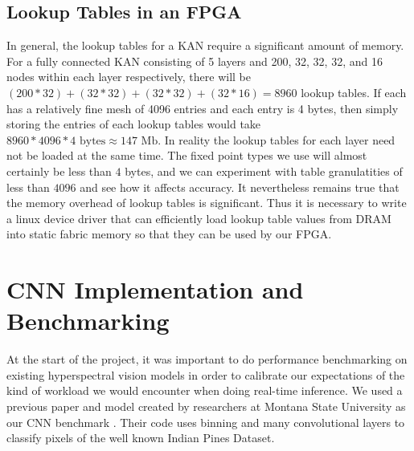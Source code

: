 \documentclass[psamsfonts]{amsart}
\theoremstyle{definition}
\theoremstyle{remark}
\numberwithin{equation}{section}
\begin{document}
\subsection{Lookup Tables in an FPGA}
In general, the lookup tables for a KAN require a significant amount of memory. For a fully connected KAN consisting of 5 layers and 200, 32, 32, 32, and 16 nodes within each layer respectively, there will be $(200 * 32) + (32 * 32) + (32 * 32) + (32 * 16) = 8960$ lookup tables. If each has a relatively fine mesh of 4096 entries and each entry is 4 bytes, then simply storing the entries of each lookup tables would take $8960 * 4096 * 4 \text{ bytes} \approx 147 \text{ Mb}$. In reality the lookup tables for each layer need not be loaded at the same time. The fixed point types we use will almost certainly be less than $4$ bytes, and we can experiment with table granulatities of less than $4096$ and see how it affects accuracy. It nevertheless remains true that the memory overhead of lookup tables is significant. Thus it is necessary to write a linux device driver that can efficiently load lookup table values from DRAM into static fabric memory so that they can be used by our FPGA.



\section{CNN Implementation and Benchmarking}
At the start of the project, it was important to do performance benchmarking on existing hyperspectral vision models in order to calibrate our expectations of the kind of workload we would encounter when doing real-time inference. We used a previous paper and model created by researchers at Montana State University as our CNN benchmark \cite{Morales_2021} \cite{rs13183649}. Their code uses binning and many convolutional layers to classify pixels of the well known Indian Pines Dataset.
\end{document}
